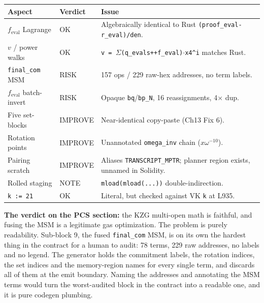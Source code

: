 \begin{center}
\small
\begin{tabular}{@{}p{}p{}p{}@{}}
\toprule
\textbf{Aspect} & \textbf{Verdict} & \textbf{Issue} \\
\midrule
$f_{\text{eval}}$ Lagrange & \textcolor{tracegreen}{OK} & Algebraically identical to Rust \texttt{(proof\_\allowbreak{}eval-r\_\allowbreak{}eval)/\allowbreak{}den}. \\
$v$ / power walks & \textcolor{tracegreen}{OK} & \texttt{v = $\Sigma$(q\_\allowbreak{}evals++f\_\allowbreak{}eval)$\cdot$x4\textasciicircum i} matches Rust. \\
\texttt{final\_com} MSM & \textcolor{rustorange}{RISK} & 157 ops / 229 raw-hex addresses, no term labels. \\
$f_{\text{eval}}$ batch-invert & \textcolor{rustorange}{RISK} & Opaque \texttt{bq}/\texttt{bp\_N}, 16 reassignments, 4$\times$ dup. \\
Five set-blocks & \textcolor{codegenblue}{IMPROVE} & Near-identical copy-paste (Ch13 Fix 6). \\
Rotation points & \textcolor{codegenblue}{IMPROVE} & Unannotated \texttt{omega\_inv} chain ($x\omega^{-10}$). \\
Pairing scratch & \textcolor{codegenblue}{IMPROVE} & Aliases \texttt{TRANSCRIPT\_MPTR}; planner region exists, unnamed in Solidity. \\
Rolled staging & \textcolor{mathpurple}{NOTE} & \texttt{mload(mload(...))} double-indirection. \\
\texttt{k := 21} & \textcolor{tracegreen}{OK} & Literal, but checked against VK \texttt{k} at L935. \\
\bottomrule
\end{tabular}
\end{center}

\textbf{The verdict on the PCS section:} the KZG multi-open math is
faithful, and fusing the MSM is a legitimate gas optimization. The
problem is purely readability. Sub-block 9, the fused
\texttt{final\_com} MSM, is on its own the hardest thing in the
contract for a human to audit: 78 terms, 229 raw addresses, no
labels and no legend. The generator holds the commitment labels,
the rotation indices, the set indices and the memory-region names
for every single term, and discards all of them at the emit
boundary. Naming the addresses and annotating the MSM terms would
turn the worst-audited block in the contract into a readable one,
and it is pure codegen plumbing.


